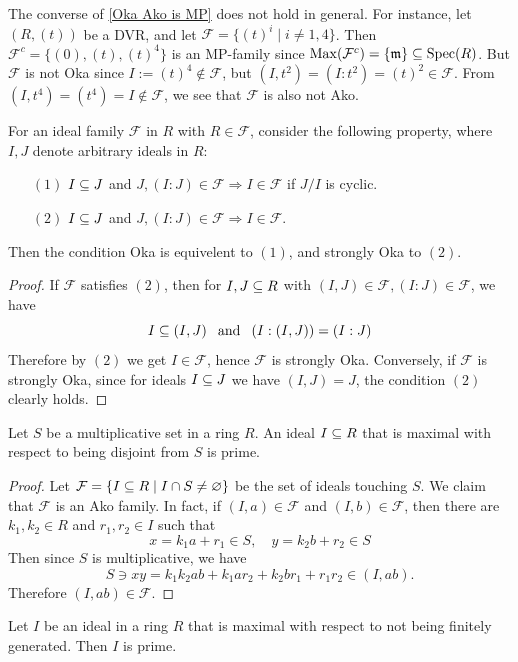 \begin{remark}
The converse of \cref{Oka Ako is MP} does not hold in general. For instance, let $(R,(t))$ be a DVR, and let $\mathcal{F}=\{(t)^i\mid i\neq 1,4\}$. Then $\mathcal{F}^c=\{(0),(t),(t)^4\}$ is an MP-family since $\mathrm{Max}(\mathcal{F}^c)=\{\mathfrak{m}\}\subseteq\mathrm{Spec}(R)$. But $\mathcal{F}$ is not Oka since $I:=(t)^4\notin\mathcal{F}$, but $(I,t^2)=(I:t^2)=(t)^2\in\mathcal{F}$. From $(I,t^4)=(t^4)=I\notin\mathcal{F}$, we see that $\mathcal{F}$ is also not Ako.
\end{remark}
\begin{proposition}\label{Oka Ako condition}
For an ideal family $\mathcal{F}$ in $R$ with $R\in\mathcal{F}$, consider the following property, where $I,J$ denote arbitrary ideals in $R$:
\begin{itemize}
\item[$(1)$] $I\subseteq J$ and $J,(I:J)\in\mathcal{F}\Rightarrow I\in\mathcal{F}$ if $J/I$ is cyclic.
\item[$(2)$] $I\subseteq J$ and $J,(I:J)\in\mathcal{F}\Rightarrow I\in\mathcal{F}$.
\end{itemize}
Then the condition Oka is equivelent to $(1)$, and strongly Oka to $(2)$.
\end{proposition}
\begin{proof}
If $\mathcal{F}$ satisfies $(2)$, then for $I,J\subseteq R$ with $(I,J)\in\mathcal{F},(I:J)\in\mathcal{F}$, we have
\[I\subseteq(I,J)\hspace{8pt}\text{and}\hspace{8pt} (I:(I,J))=(I:J)\]
Therefore by $(2)$ we get $I\in\mathcal{F}$, hence $\mathcal{F}$ is strongly Oka. Conversely, if $\mathcal{F}$ is strongly Oka, since for ideals $I\subseteq J$ we have $(I,J)=J$, the condition $(2)$ clearly holds.
\end{proof}
\begin{theorem}\label{multiplicative prime}
Let $S$ be a multiplicative set in a ring $R$. An ideal $I\subseteq R$ that is maximal with respect to being disjoint from $S$ is prime.
\end{theorem}
\begin{proof}
Let $\mathcal{F}=\{I\subseteq R\mid I\cap S\neq\varnothing\}$ be the set of ideals touching $S$. We claim that $\mathcal{F}$ is an Ako family. In fact, if $(I,a)\in\mathcal{F}$ and $(I,b)\in\mathcal{F}$, then there are $k_1,k_2\in R$ and $r_1,r_2\in I$ such that
\[x=k_1a+r_1\in S,\quad y=k_2b+r_2\in S\]
Then since $S$ is multiplicative, we have
\[S\ni xy=k_1k_2ab+k_1ar_2+k_2br_1+r_1r_2\in(I,ab).\]
Therefore $(I,ab)\in\mathcal{F}$.
\end{proof}
\begin{theorem}
Let $I$ be an ideal in a ring $R$ that is maximal with respect to not being finitely generated. Then $I$ is prime.
\end{theorem}
